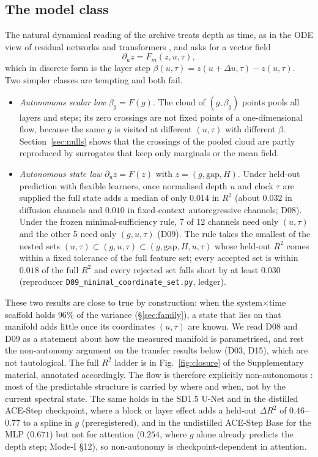 \documentclass[11pt]{article}
\theoremstyle{definition}
\newcommand{\gap}{\mathrm{gap}}
\begin{document}
\subsection{The model class}
The natural dynamical reading of the archive treats depth as time, as in the ODE view of residual networks and transformers \citep{e2017proposal,lu2018beyond,lu2019understanding,chen2018neural,geshkovski2025mathematical}, and asks for a vector field
\begin{equation}\label{eq:flow}
 \partial_u z = F_m(z,u,\tau),
\end{equation}
which in discrete form is the layer step $\beta(u,\tau)=z(u+\Delta u,\tau)-z(u,\tau)$. Two simpler classes are tempting and both fail.
\begin{itemize}
 \item \emph{Autonomous scalar law} $\beta_g=F(g)$. The cloud of $(g,\beta_g)$ points pools all layers and steps; its zero crossings are not fixed points of a one-dimensional flow, because the same $g$ is visited at different $(u,\tau)$ with different $\beta$. Section~\ref{sec:nulls} shows that the crossings of the pooled cloud are partly reproduced by surrogates that keep only marginals or the mean field.
 \item \emph{Autonomous state law} $\partial_uz=F(z)$ with $z=(g,\gap,H)$. Under held-out prediction with flexible learners, once normalised depth $u$ and clock $\tau$ are supplied the full state adds a median of only $0.014$ in $R^2$ (about $0.032$ in diffusion channels and $0.010$ in fixed-context autoregressive channels; D08). Under the frozen minimal-sufficiency rule, 7 of 12 channels need only $(u,\tau)$ and the other 5 need only $(g,u,\tau)$ (D09). The rule takes the smallest of the nested sets $(u,\tau)\subset(g,u,\tau)\subset(g,\gap,H,u,\tau)$ whose held-out $R^2$ comes within a fixed tolerance of the full feature set; every accepted set is within $0.018$ of the full $R^2$ and every rejected set falls short by at least $0.030$ (reproducer \texttt{D09\_minimal\_coordinate\_set.py}, ledger).
\end{itemize}
These two results are close to true by construction: when the system$\times$time scaffold holds $96\%$ of the variance (\S\ref{sec:family}), a state that lies on that manifold adds little once its coordinates $(u,\tau)$ are known. We read D08 and D09 as a statement about how the measured manifold is parametrised, and rest the non-autonomy argument on the transfer results below (D03, D15), which are not tautological. The full $R^2$ ladder is in Fig.~\ref{fig:closure} of the Supplementary material, annotated accordingly.
The flow is therefore explicitly non-autonomous \citep{kloeden2011nonautonomous}: most of the predictable structure is carried by where and when, not by the current spectral state. The same holds in the SD1.5 U-Net and in the distilled ACE-Step checkpoint, where a block or layer effect adds a held-out $\Delta R^2$ of $0.46$--$0.77$ to a spline in $g$ (preregistered), and in the undistilled ACE-Step Base for the MLP ($0.671$) but not for attention ($0.254$, where $g$ alone already predicts the depth step; Mode-I \S12), so non-autonomy is checkpoint-dependent in attention.
\end{document}
